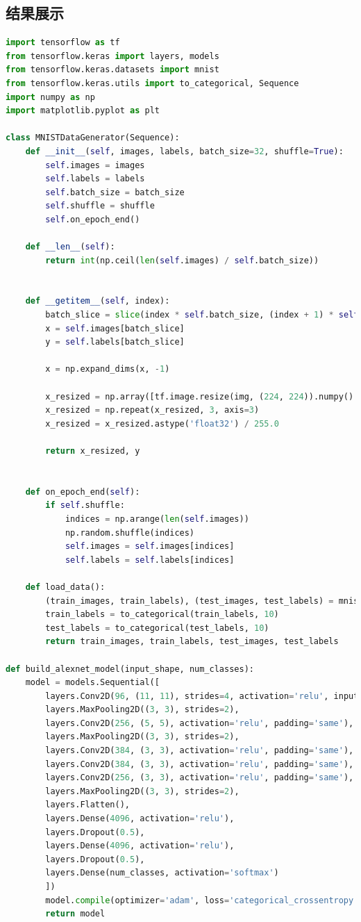 \documentclass[a4paper,12pt]{article}
\begin{document}
\subsection{结果展示}
\begin{lstlisting}[language=Python]
import tensorflow as tf
from tensorflow.keras import layers, models
from tensorflow.keras.datasets import mnist
from tensorflow.keras.utils import to_categorical, Sequence
import numpy as np
import matplotlib.pyplot as plt

class MNISTDataGenerator(Sequence):
	def __init__(self, images, labels, batch_size=32, shuffle=True):
		self.images = images
		self.labels = labels
		self.batch_size = batch_size
		self.shuffle = shuffle
		self.on_epoch_end()

	def __len__(self):
		return int(np.ceil(len(self.images) / self.batch_size))


	def __getitem__(self, index):
		batch_slice = slice(index * self.batch_size, (index + 1) * self.batch_size)
		x = self.images[batch_slice]
		y = self.labels[batch_slice]

		x = np.expand_dims(x, -1) 

		x_resized = np.array([tf.image.resize(img, (224, 224)).numpy() for img in x])
		x_resized = np.repeat(x_resized, 3, axis=3) 
		x_resized = x_resized.astype('float32') / 255.0

		return x_resized, y


	def on_epoch_end(self):
		if self.shuffle:
			indices = np.arange(len(self.images))
			np.random.shuffle(indices)
			self.images = self.images[indices]
			self.labels = self.labels[indices]

	def load_data():
		(train_images, train_labels), (test_images, test_labels) = mnist.load_data()
		train_labels = to_categorical(train_labels, 10)
		test_labels = to_categorical(test_labels, 10)
		return train_images, train_labels, test_images, test_labels

def build_alexnet_model(input_shape, num_classes):
	model = models.Sequential([
		layers.Conv2D(96, (11, 11), strides=4, activation='relu', input_shape=input_shape),
		layers.MaxPooling2D((3, 3), strides=2),
		layers.Conv2D(256, (5, 5), activation='relu', padding='same'),
		layers.MaxPooling2D((3, 3), strides=2),
		layers.Conv2D(384, (3, 3), activation='relu', padding='same'),
		layers.Conv2D(384, (3, 3), activation='relu', padding='same'),
		layers.Conv2D(256, (3, 3), activation='relu', padding='same'),
		layers.MaxPooling2D((3, 3), strides=2),
		layers.Flatten(),
		layers.Dense(4096, activation='relu'),
		layers.Dropout(0.5),
		layers.Dense(4096, activation='relu'),
		layers.Dropout(0.5),
		layers.Dense(num_classes, activation='softmax')
		])
		model.compile(optimizer='adam', loss='categorical_crossentropy', metrics=['accuracy'])
		return model


\end{lstlisting}
\end{document}
